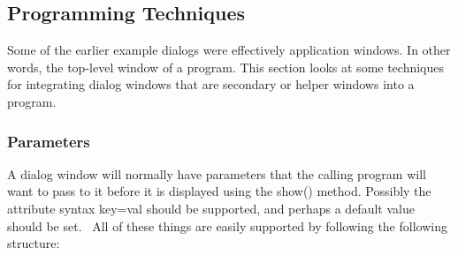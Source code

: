 \subsection{Programming Techniques}

Some of the earlier example dialogs were effectively
{\textquotedbl}application windows.{\textquotedbl} In other words, the
top-level window of a program. This section looks at some techniques
for integrating dialog windows that are secondary or helper windows
into a program.

\subsubsection[Parameters]{Parameters}

A dialog window will normally have parameters that the calling program
will want to pass to it before it is displayed using the
\textsf{show()} method. Possibly the attribute syntax
\textsf{{\textquotedbl}key=val{\textquotedbl}} should be supported, and
perhaps a default value should be set. \ All of these things are easily
supported by following the following structure:


